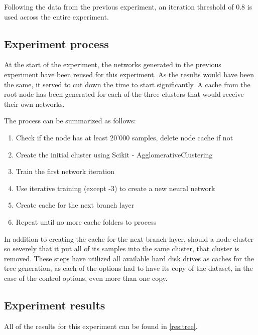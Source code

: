 Following the data from the previous experiment, an iteration threshold of 0.8 is used across the entire experiment.

\subsection{Experiment process}
At the start of the experiment, the networks generated in the previous experiment have been reused for this experiment.
As the results would have been the same, it served to cut down the time to start significantly.
A cache from the root node has been generated for each of the three clusters that would receive their own networks.

The process can be summarized as follows:
\begin{enumerate}
    \item Check if the node has at least 20'000 samples, delete node cache if not
    \item Create the initial cluster using Scikit - AgglomerativeClustering
    \item Train the first network iteration
    \item Use iterative training (except -3) to create a new neural network
    \item Create cache for the next branch layer
    \item Repeat until no more cache folders to process
\end{enumerate}

In addition to creating the cache for the next branch layer, should a node cluster so severely that it put all of its samples into the same cluster, that cluster is removed.
These steps have utilized all available hard disk drives as caches for the tree generation, as each of the options had to have its copy of the dataset, in the case of the control options, even more than one copy.



\subsection{Experiment results}
All of the results for this experiment can be found in \cref{res:tree}.